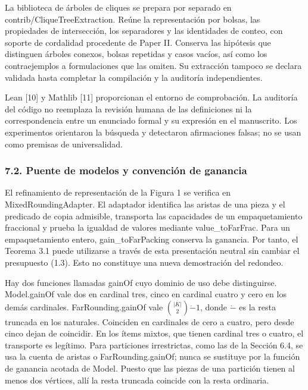 \documentclass[spanish,11pt,a4paper]{article}
\begin{document}
La biblioteca de árboles de cliques se prepara por separado en {\ttfamily\small contrib/\discretionary{\hbox{\ensuremath{\hookrightarrow}}}{}{}CliqueTreeEx\discretionary{\hbox{\ensuremath{\hookrightarrow}}}{}{}traction}. Reúne la representación por bolsas, las propiedades de intersección, los separadores y las identidades de conteo, con soporte de cordalidad procedente de Paper II. Conserva las hipótesis que distinguen árboles conexos, bolsas repetidas y casos vacíos, así como los contraejemplos a formulaciones que las omiten. Su extracción tampoco se declara validada hasta completar la compilación y la auditoría independientes.

Lean {[}10{]} y Mathlib {[}11{]} proporcionan el entorno de comprobación. La auditoría del código no reemplaza la revisión humana de las definiciones ni la correspondencia entre un enunciado formal y su expresión en el manuscrito. Los experimentos orientaron la búsqueda y detectaron afirmaciones falsas; no se usan como premisas de universalidad.

\subsubsection{7.2. Puente de modelos y convención de ganancia}\label{puente-de-modelos-y-convencion-de-ganancia}

El refinamiento de representación de la Figura 1 se verifica en {\ttfamily\small MixedRoundin\discretionary{\hbox{\ensuremath{\hookrightarrow}}}{}{}gAdapter}. El adaptador identifica las aristas de una pieza y el predicado de copia admisible, transporta las capacidades de un empaquetamiento fraccional y prueba la igualdad de valores mediante {\ttfamily\small value\_\discretionary{\hbox{\ensuremath{\hookrightarrow}}}{}{}toFarFrac}. Para un empaquetamiento entero, {\ttfamily\small gain\_\discretionary{\hbox{\ensuremath{\hookrightarrow}}}{}{}toFarPacking} conserva la ganancia. Por tanto, el Teorema 3.1 puede utilizarse a través de esta presentación neutral sin cambiar el presupuesto (1.3). Esto no constituye una nueva demostración del redondeo.

Hay dos funciones llamadas {\ttfamily\small gainOf} cuyo dominio de uso debe distinguirse. {\ttfamily\small Model.\discretionary{\hbox{\ensuremath{\hookrightarrow}}}{}{}gainOf} vale dos en cardinal tres, cinco en cardinal cuatro y cero en los demás cardinales. {\ttfamily\small FarRounding.\discretionary{\hbox{\ensuremath{\hookrightarrow}}}{}{}gainOf} vale \(\binom{|K|}{2}\mathbin{\dot-}1\), donde \(\dot-\) es la resta truncada en los naturales. Coinciden en cardinales de cero a cuatro, pero desde cinco dejan de coincidir. En los ítems mixtos, que tienen cardinal tres o cuatro, el transporte es legítimo. Para particiones irrestrictas, como las de la Sección 6.4, se usa la cuenta de aristas o {\ttfamily\small FarRounding.\discretionary{\hbox{\ensuremath{\hookrightarrow}}}{}{}gainOf}; nunca se sustituye por la función de ganancia acotada de Model. Puesto que las piezas de una partición tienen al menos dos vértices, allí la resta truncada coincide con la resta ordinaria.
\end{document}
